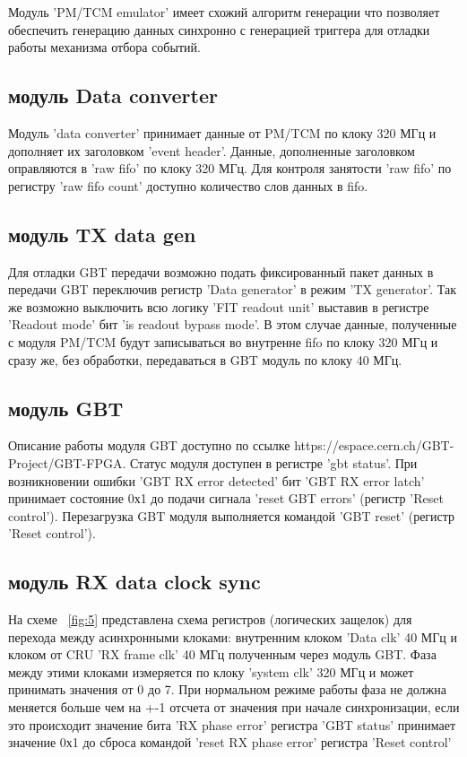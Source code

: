 \documentclass{article}
\begin{document}
Модуль 'PM/TCM emulator' имеет схожий алгоритм генерации что позволяет обеспечить генерацию данных синхронно с генерацией триггера для отладки работы механизма отбора событий.




\subsection{модуль Data converter}
Модуль 'data converter' принимает данные от PM/TCM по клоку 320 МГц и дополняет их заголовком 'event header'. Данные, дополненные заголовком оправляются в 'raw fifo' по клоку 320 МГц. Для контроля занятости 'raw fifo' по регистру 'raw fifo count' доступно количество слов данных в fifo.



\subsection{модуль TX data gen}
Для отладки GBT передачи возможно подать фиксированный пакет данных в передачи GBT переключив регистр 'Data generator' в режим 'TX generator'. Так же возможно выключить всю логику 'FIT readout unit' выставив в регистре 'Readout mode' бит 'is readout bypass mode'. В этом случае данные, полученные с модуля PM/TCM будут записываться во внутренне fifo по клоку 320 МГц и сразу же, без обработки, передаваться в GBT модуль по клоку 40 МГц.


\subsection{модуль GBT}
Описание работы модуля GBT доступно по ссылке https://espace.cern.ch/GBT-Project/GBT-FPGA. Статус модуля доступен в регистре 'gbt status'. При возникновении ошибки 'GBT RX error detected' бит 'GBT RX error latch' принимает состояние 0х1 до подачи сигнала 'reset GBT errors' (регистр 'Reset control'). Перезагрузка GBT модуля выполняется командой 'GBT reset' (регистр 'Reset control').


\subsection{модуль RX data clock sync}
На схеме ~\ref{fig:5} представлена схема регистров (логических защелок) для перехода между асинхронными клоками: внутренним клоком 'Data clk' 40 МГц и клоком от CRU 'RX frame clk' 40 МГц полученным через модуль GBT. Фаза между этими клоками измеряется по клоку 'system clk' 320 МГц и может принимать значения от 0 до 7. При нормальном режиме работы фаза не должна меняется больше чем на +-1 отсчета от значения при начале синхронизации, если это происходит значение бита 'RX phase error' регистра 'GBT status' принимает значение 0х1 до сброса командой 'reset RX phase error' регистра 'Reset control'
\end{document}
